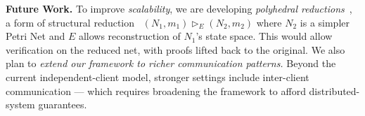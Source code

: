 \smallskip
\noindent
\textbf{Future Work.}
To improve \textit{scalability}, we are developing \textit{polyhedral reductions}~\cite{AmBeDa21}, a form of structural reduction~\cite{Be87,BeLeDa20} $(N_1, m_1) \vartriangleright_E (N_2, m_2)$ where $N_2$ is a simpler Petri Net and $E$ allows reconstruction of $N_1$’s state space. This would allow verification on the reduced net, with proofs lifted back to the original.
%
We also plan to \textit{extend our framework to richer communication patterns.} Beyond the current independent-client model, stronger settings include inter-client communication ---
which requires 
broadening the framework to afford distributed-system guarantees.
%
%
%
%
%
%
%
%
%


